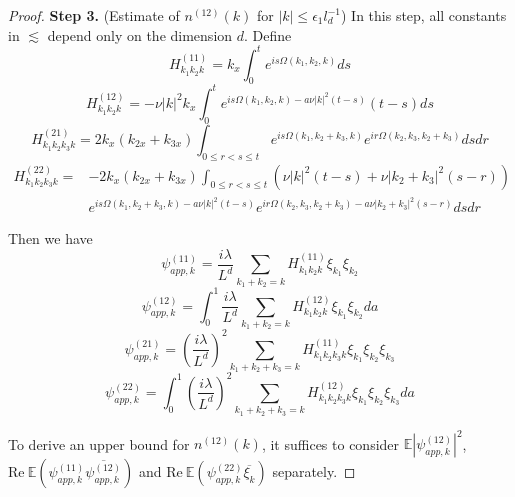 \begin{proof}
\textbf{Step 3.} (Estimate of $n^{(12)}(k)$ for $|k|\le \epsilon_1 l_{d}^{-1}$) In this step, all constants in $\lesssim$ depend only on the dimension $d$. Define 
\begin{equation}\label{eq.H(11).threewave}
    H^{(11)}_{k_1k_2k}=k_{x} \int^{t}_0e^{i s\Omega(k_1,k_2,k)} ds
\end{equation}
\begin{equation}\label{eq.H(12).threewave}
    H^{(12)}_{k_1k_2k}=-\nu|k|^2k_{x} \int^{t}_0e^{i s\Omega(k_1,k_2,k)- a\nu|k|^2(t-s)} (t-s)ds
\end{equation}
\begin{equation}\label{eq.H(21).threewave}
    H^{(21)}_{k_1k_2k_3k}=2k_{x}(k_{2x}+k_{3x})\int_{0\le r<s\le t}e^{i s\Omega(k_1,k_2+k_3,k)} e^{i r\Omega(k_2,k_3,k_2+k_3)} dsdr
\end{equation}
\begin{equation}\label{eq.H(22).threewave}
\begin{split}
    H^{(22)}_{k_1k_2k_3k}=&-2k_{x}(k_{2x}+k_{3x})\int_{0\le r<s\le t}(\nu|k|^2(t-s)+\nu|k_2+k_3|^2(s-r))
    \\
    & e^{i s\Omega(k_1,k_2+k_3,k)- a\nu|k|^2(t-s)} e^{i r\Omega(k_2,k_3,k_2+k_3)- a\nu|k_2+k_3|^2(s-r)} dsdr
\end{split}
\end{equation}

Then we have
\begin{equation}\label{eq.psi(11)app.threewave}
    \psi^{(11)}_{app,k}=\frac{i\lambda}{L^{d}} \sum\limits_{k_1+k_2=k} H^{(11)}_{k_1k_2k}\xi_{k_1} \xi_{k_2} 
\end{equation}
\begin{equation}\label{eq.psi(12)app.threewave}
    \psi^{(12)}_{app,k}=\int^1_{0}\frac{i\lambda}{L^{d}} \sum\limits_{k_1+k_2=k} H^{(12)}_{k_1k_2k}\xi_{k_1} \xi_{k_2} da 
\end{equation}
\begin{equation}\label{eq.psi(21)app.threewave}
    \psi^{(21)}_{app,k}=\left(\frac{i\lambda}{L^{d}}\right)^2 \sum\limits_{k_1+k_2+k_3=k} H^{(11)}_{k_1k_2k_3k}\xi_{k_1} \xi_{k_2}\xi_{k_3} 
\end{equation}
\begin{equation}\label{eq.psi(22)app.threewave}
    \psi^{(22)}_{app,k}=\int^1_{0}\left(\frac{i\lambda}{L^{d}}\right)^2 \sum\limits_{k_1+k_2+k_3=k} H^{(12)}_{k_1k_2k_3k}\xi_{k_1} \xi_{k_2}\xi_{k_3} da 
\end{equation}

To derive an upper bound for $n^{(12)}(k)$, it suffices to consider $\mathbb E \left|\psi^{(12)}_{app,k}\right|^2$, $\text{Re}\ \mathbb E \left(\psi^{(11)}_{app,k}\overline{\psi^{(12)}_{app,k}}\right)$ and $\text{Re}\  \mathbb E \left(\psi^{(22)}_{app,k}\overline{\xi_k}\right)$ separately.


\end{proof}
